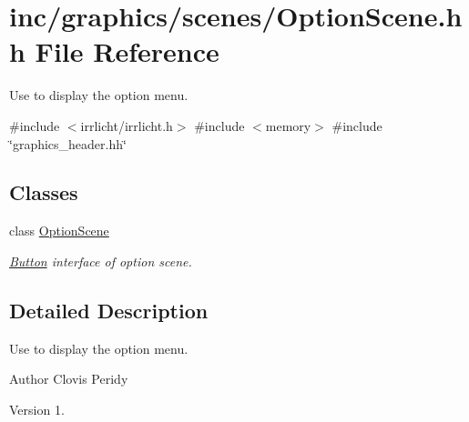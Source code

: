 \hypertarget{OptionScene_8hh}{}\section{inc/graphics/scenes/\+Option\+Scene.hh File Reference}
\label{OptionScene_8hh}


Use to display the option menu.  


{\ttfamily \#include $<$irrlicht/irrlicht.\+h$>$}\newline
{\ttfamily \#include $<$memory$>$}\newline
{\ttfamily \#include \char`\"{}graphics\+\_\+header.\+hh\char`\"{}}\newline
\subsection*{Classes}
\begin{DoxyCompactItemize}
\item 
class \hyperlink{classOptionScene}{Option\+Scene}
\begin{DoxyCompactList}\small\item\em \hyperlink{classButton}{Button} interface of option scene. \end{DoxyCompactList}\end{DoxyCompactItemize}


\subsection{Detailed Description}
Use to display the option menu. 

\begin{DoxyAuthor}{Author}
Clovis Peridy 
\end{DoxyAuthor}
\begin{DoxyVersion}{Version}
1. 
\end{DoxyVersion}
